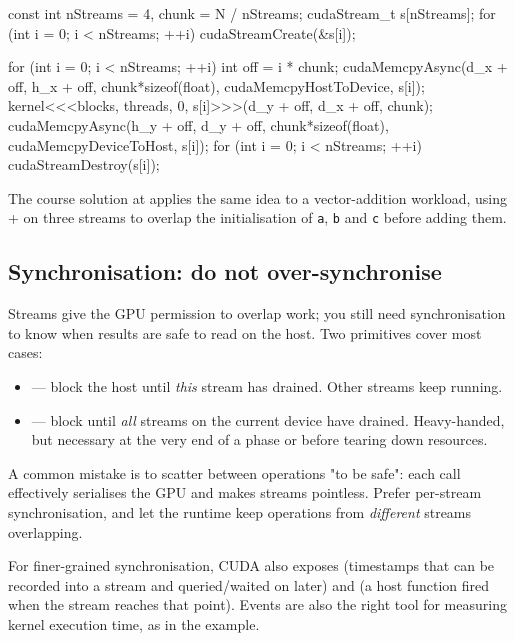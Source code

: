 \begin{codeblock}[language=C]
const int nStreams = 4, chunk = N / nStreams;
cudaStream_t s[nStreams];
for (int i = 0; i < nStreams; ++i) cudaStreamCreate(&s[i]);

for (int i = 0; i < nStreams; ++i) {
    int off = i * chunk;
    cudaMemcpyAsync(d_x + off, h_x + off, chunk*sizeof(float),
                    cudaMemcpyHostToDevice, s[i]);
    kernel<<<blocks, threads, 0, s[i]>>>(d_y + off, d_x + off, chunk);
    cudaMemcpyAsync(h_y + off, d_y + off, chunk*sizeof(float),
                    cudaMemcpyDeviceToHost, s[i]);
}
for (int i = 0; i < nStreams; ++i) cudaStreamDestroy(s[i]);
\end{codeblock}

The course solution at  applies the same idea to a vector-addition workload, using  +  on three streams to overlap the initialisation of \texttt{a}, \texttt{b} and \texttt{c} before adding them.

\subsection{Synchronisation: do not over-synchronise}

Streams give the GPU permission to overlap work; you still need synchronisation to know when results are safe to read on the host. Two primitives cover most cases:

\begin{itemize}
    \item {} --- block the host until \emph{this} stream has drained. Other streams keep running.
    \item {} --- block until \emph{all} streams on the current device have drained. Heavy-handed, but necessary at the very end of a phase or before tearing down resources.
\end{itemize}

A common mistake is to scatter  between operations "to be safe": each call effectively serialises the GPU and makes streams pointless. Prefer per-stream synchronisation, and let the runtime keep operations from \emph{different} streams overlapping.

\begin{tipsblock}
For finer-grained synchronisation, CUDA also exposes  (timestamps that can be recorded into a stream and queried/waited on later) and  (a host function fired when the stream reaches that point). Events are also the right tool for measuring kernel execution time, as in the  example.
\end{tipsblock}

